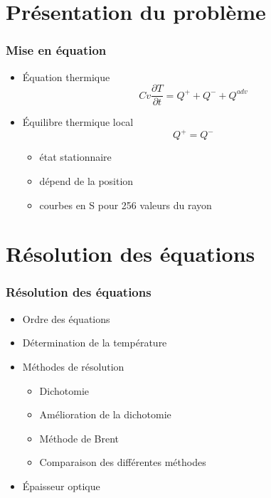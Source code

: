 \section{Présentation du problème}
\begin{frame}
\frametitle{Mise en équation}

   \begin{itemize}
      \item Équation thermique
      \begin{equation}
         Cv\frac{\partial T}{\partial t} = Q^+ + Q^- +Q^{adv}
      \end{equation}
      
   \item Équilibre thermique local
   \begin{equation}
      Q^+ = Q^- 
   \end{equation}
   
      \begin{itemize}
         \item état stationnaire
         \\
         \item dépend de la position
         \item courbes en S pour 256 valeurs du rayon
      \end{itemize}
\end{itemize}
\end{frame}

\section{Résolution des équations}
\begin{frame}
\frametitle{Résolution des équations}

   \begin{itemize}
      \item Ordre des équations
      \item Détermination de la température
      \item Méthodes de résolution
         \begin{itemize} 
            \item Dichotomie
            \item Amélioration de la dichotomie
            \item Méthode de Brent
            \item Comparaison des différentes méthodes
         \end{itemize}
      \item Épaisseur optique
   \end{itemize}
\end{frame}

